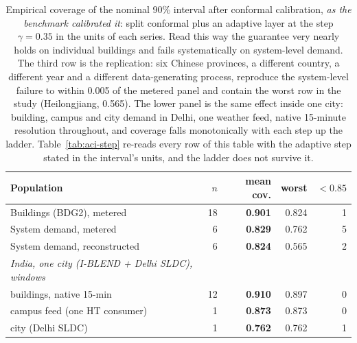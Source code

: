 \begin{table}[t]
\centering
\small
\begin{tabular}{lrrrr}
\toprule
Population & $n$ & mean cov. & worst & $<0.85$ \\
\midrule
Buildings (BDG2), metered & 18 & \textbf{0.901} & 0.824 & 1 \\
System demand, metered & 6 & \textbf{0.829} & 0.762 & 5 \\
System demand, reconstructed & 6 & \textbf{0.824} & 0.565 & 2 \\
\midrule
\emph{India, one city (I-BLEND + Delhi SLDC), windows} &  &  &  &  \\
\quad buildings, native 15-min & 12 & \textbf{0.910} & 0.897 & 0 \\
\quad campus feed (one HT consumer) & 1 & \textbf{0.873} & 0.873 & 0 \\
\quad city (Delhi SLDC) & 1 & \textbf{0.762} & 0.762 & 1 \\
\bottomrule
\end{tabular}
\caption{Empirical coverage of the nominal 90\% interval after conformal calibration, \emph{as the benchmark calibrated it}: split conformal plus an adaptive layer at the step $\gamma=0.35$ in the units of each series. Read this way the guarantee very nearly holds on individual buildings and fails systematically on system-level demand. The third row is the replication: six Chinese provinces, a different country, a different year and a different data-generating process, reproduce the system-level failure to within 0.005 of the metered panel and contain the worst row in the study (Heilongjiang, 0.565). The lower panel is the same effect inside one city: building, campus and city demand in Delhi, one weather feed, native 15-minute resolution throughout, and coverage falls monotonically with each step up the ladder. Table~\ref{tab:aci-step} re-reads every row of this table with the adaptive step stated in the interval's units, and the ladder does not survive it.}
\label{tab:calibration}
\end{table}
